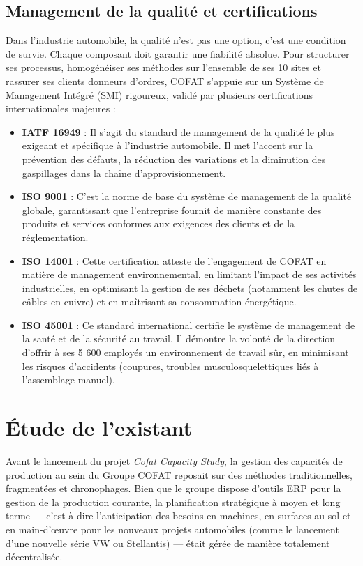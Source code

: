 \subsection{Management de la qualité et certifications}
Dans l'industrie automobile, la qualité n'est pas une option, c'est une condition de survie. Chaque composant doit garantir une fiabilité absolue. Pour structurer ses processus, homogénéiser ses méthodes sur l'ensemble de ses 10 sites et rassurer ses clients donneurs d'ordres, COFAT s'appuie sur un Système de Management Intégré (SMI) rigoureux, validé par plusieurs certifications internationales majeures :

\begin{itemize}
    \item \textbf{IATF 16949} : Il s'agit du standard de management de la qualité le plus exigeant et spécifique à l'industrie automobile. Il met l'accent sur la prévention des défauts, la réduction des variations et la diminution des gaspillages dans la chaîne d'approvisionnement.
    \item \textbf{ISO 9001} : C'est la norme de base du système de management de la qualité globale, garantissant que l'entreprise fournit de manière constante des produits et services conformes aux exigences des clients et de la réglementation.
    \item \textbf{ISO 14001} : Cette certification atteste de l'engagement de COFAT en matière de management environnemental, en limitant l'impact de ses activités industrielles, en optimisant la gestion de ses déchets (notamment les chutes de câbles en cuivre) et en maîtrisant sa consommation énergétique.
    \item \textbf{ISO 45001} : Ce standard international certifie le système de management de la santé et de la sécurité au travail. Il démontre la volonté de la direction d'offrir à ses 5 600 employés un environnement de travail sûr, en minimisant les risques d'accidents (coupures, troubles musculosquelettiques liés à l'assemblage manuel).
\end{itemize}

\section{Étude de l'existant}
Avant le lancement du projet \textit{Cofat Capacity Study}, la gestion des capacités de production au sein du Groupe COFAT reposait sur des méthodes traditionnelles, fragmentées et chronophages. Bien que le groupe dispose d'outils ERP pour la gestion de la production courante, la planification stratégique à moyen et long terme — c'est-à-dire l'anticipation des besoins en machines, en surfaces au sol et en main-d'œuvre pour les nouveaux projets automobiles (comme le lancement d'une nouvelle série VW ou Stellantis) — était gérée de manière totalement décentralisée.

